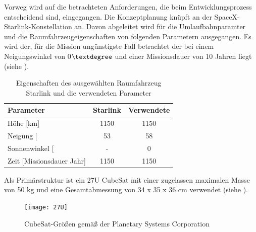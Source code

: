 Vorweg wird auf die betrachteten Anforderungen, die beim Entwicklungsprozess entscheidend  sind, eingegangen. Die Konzeptplanung knüpft an der SpaceX-Starlink-Konstellation an. Davon abgeleitet wird für die Umlaufbahnparamter und die Raumfahrzeugeigenschaften von folgenden Parametern ausgegangen. Es wird der, für die Mission ungünstigste Fall betrachtet der bei einem Neigungswinkel von 0$\textdegree$ und einer Missionsdauer von 10 Jahren liegt (siehe ).
\begin{table}[!h]
\centering
	\begin{tabular}{|l|c|c|}
\hline
\multicolumn{1}{|l|}{Parameter}          & \multicolumn{1}{l|}{Starlink} & \multicolumn{1}{l|}{Verwendete} \\ \hline
\multicolumn{1}{|l|}{Höhe {[}km{]}}      & \multicolumn{1}{c|}{1150}     & \multicolumn{1}{c|}{1150}       \\ \hline
\multicolumn{1}{|l|}{Neigung {[}\textdegree{]}} & \multicolumn{1}{c|}{53}       & \multicolumn{1}{c|}{58}       \\ \hline
\multicolumn{1}{|l|}{Sonnenwinkel {[}\textdegree{]}}       & \multicolumn{1}{c|}{-}        & \multicolumn{1}{c|}{0}          \\ \hline
\multicolumn{1}{|l|}{Zeit {[}Missionsdauer {Jahr]}}      & \multicolumn{1}{c|}{1150}     & \multicolumn{1}{c|}{1150}       \\ \hline
          
	\end{tabular}
	\caption{Eigenschaften des ausgewählten Raumfahrzeug Starlink und die verwendeten Parameter \cite{Lettau.}}
	\label{tab:parameter}
\end{table}
Als Primärstruktur ist ein 27U CubeSat mit einer zugelassen maximalen Masse von 50 kg und eine Gesamtabmessung von 34 x 35 x 36 cm verwendet (siehe ). 				
				\begin{figure}[!h]
					\centering
						\texttt{[image: 27U]}
					\caption{CubeSat-Größen gemäß der Planetary Systems Corporation \cite{Lettau.}}
					\label{fig:27U}
				\end{figure}
